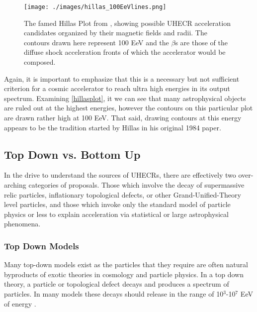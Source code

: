 \begin{figure}
\begin{center}
\texttt{[image: ./images/hillas\_100EeVlines.png]}
\caption[Hillas Plot]{The famed Hillas Plot from \cite{stanev}, showing possible UHECR acceleration candidates organized by their magnetic fields and radii. The contours drawn here represent 100 EeV and the $\beta$s are those of the diffuse shock acceleration fronts of which the accelerator would be composed.}
\label{hillasplot}
\end{center}
\end{figure}
Again, it is important to emphasize that this is a necessary but not sufficient criterion for a cosmic accelerator to reach ultra high energies in its output spectrum. Examining \autoref{hillasplot}, it we can see that many astrophysical objects are ruled out at the highest energies, however the contours on this particular plot are drawn rather high at 100 EeV. That said, drawing contours at this energy appears to be the tradition started by Hillas in his original 1984 paper.
\subsection{Top Down vs. Bottom Up}%
In the drive to understand the sources of UHECRs, there are effectively two over-arching categories of proposals. Those which involve the decay of supermassive relic particles, inflationary topological defects, or other Grand-Unified-Theory level particles, and those which invoke only the standard model of particle physics or less to explain acceleration via statistical or large astrophysical phenomena. 
\subsubsection{Top Down Models}
Many top-down models exist as the particles that they require are often natural byproducts of exotic theories in cosmology and particle physics. In a top down theory, a particle or topological defect decays and produces a spectrum of particles. In many models these decays should release in the range of 10$^3$-10$^7$ EeV of energy \cite{stanev}. 

